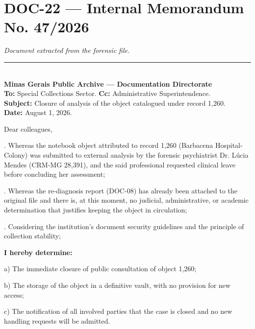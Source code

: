 \section*{\textbf{DOC-22} --- Internal Memorandum No. 47/2026}

\noindent \textit{Document extracted from the forensic file.}

\vspace{0.5em}\noindent\rule{\textwidth}{0.5pt}\vspace{0.5em}

\\[-0.2em]

\noindent \textbf{Minas Gerais Public Archive --- Documentation Directorate}\\
\noindent \textbf{To:} Special Collections Sector. \textbf{Cc:} Administrative Superintendence.\\
\noindent \textbf{Subject:} Closure of analysis of the object catalogued under record 1,260.\\
\noindent\textbf{Date:} August 1, 2026.

\noindent Dear colleagues,

. Whereas the notebook object attributed to record 1,260 (Barbacena Hospital-Colony) was submitted to external analysis by the forensic psychiatrist Dr. Lúcia Mendes (CRM-MG 28,391), and the said professional requested clinical leave before concluding her assessment;

. Whereas the re-diagnosis report (DOC-08) has already been attached to the original file and there is, at this moment, no judicial, administrative, or academic determination that justifies keeping the object in circulation;

. Considering the institution's document security guidelines and the principle of collection stability;

\noindent \textbf{I hereby determine:}

\noindent a) The immediate closure of public consultation of object 1,260;

\noindent b) The storage of the object in a definitive vault, with no provision for new access;

\noindent c) The notification of all involved parties that the case is closed and no new handling requests will be admitted.

